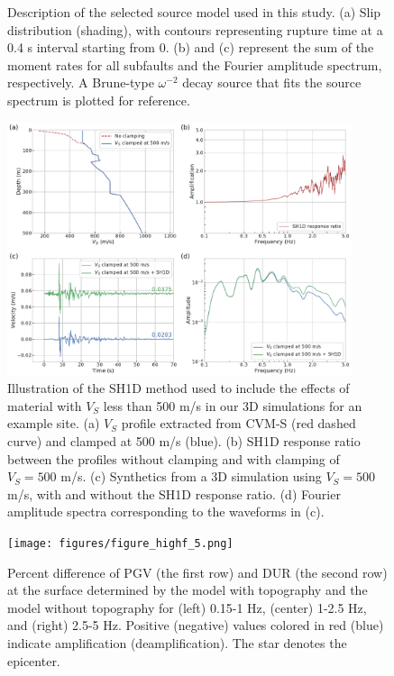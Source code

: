 \begin{figure}[!ht]
  \caption{Description of the selected source model used in this study. (a) Slip distribution (shading), with contours representing rupture time at a 0.4 s interval starting from 0. (b) and (c) represent the sum of the moment rates for all subfaults and the Fourier amplitude spectrum, respectively. A Brune-type  $\omega^{-2}$ decay source \citep{brune1970tectonic} that fits the source spectrum is plotted for reference.}
  \label{fig:highf-3}
\end{figure}
\clearpage


\begin{figure}[!ht]
  \centering
  \includegraphics[width=0.9\textwidth,height=0.9\textheight,keepaspectratio]{figures/figure_highf_4.pdf}
  \caption{Illustration of the SH1D method used to include the effects of material with $V_S$ less than 500 m/s in our 3D simulations for an example site. (a) $V_S$ profile extracted from CVM-S (red dashed curve) and clamped at 500 m/s (blue). (b) SH1D response ratio between the profiles without clamping and with clamping of $V_S =500$ m/s. (c) Synthetics from a 3D simulation using $V_S=500$ m/s, with and without the SH1D response ratio. (d) Fourier amplitude spectra corresponding to the waveforms in (c).}
  \label{fig:highf-4}
\end{figure}
\clearpage

\begin{figure}[!ht]
  \centering
  \texttt{[image: figures/figure\_highf\_5.png]}
  \caption{Percent difference of PGV (the first row) and DUR (the second row) at the surface determined by the model with topography and the model without topography for (left) 0.15-1 Hz, (center) 1-2.5 Hz, and (right) 2.5-5 Hz. Positive (negative) values colored in red (blue) indicate amplification (deamplification). The star denotes the epicenter.
  }
  \label{fig:highf-5}
\end{figure}
\clearpage

